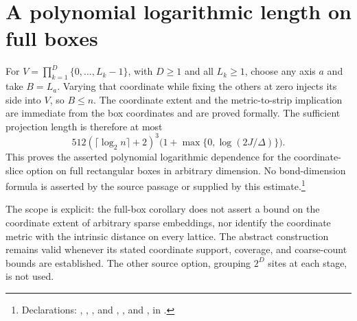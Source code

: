 \documentclass{article}
\begin{document}
\section{A polynomial logarithmic length on full boxes}

For $V=\prod_{k=1}^D\{0,\ldots,L_k-1\}$, with $D\ge1$ and all
$L_k\ge1$, choose any axis $a$ and take $B=L_a$. Varying that coordinate
while fixing the others at zero injects its side into $V$, so $B\le n$.
The coordinate extent and the metric-to-strip implication are immediate
from the box coordinates and are proved formally. The sufficient
projection length is therefore at most
\[
 512(\lceil\log_2n\rceil+2)^3
 \bigl(1+\max\{0,\log(2J/\Delta)\}\bigr).
\]
This proves the asserted polynomial logarithmic dependence for the
coordinate-slice option on full rectangular boxes in arbitrary dimension.
No bond-dimension formula is asserted by the source passage or supplied
by this estimate.\footnote{Declarations:
,
,
, and
,
, and
,
in .}

The scope is explicit: the full-box corollary does not assert a bound on
the coordinate extent of arbitrary sparse embeddings, nor identify the
coordinate metric with the intrinsic distance on every lattice. The
abstract construction remains valid whenever its stated coordinate
support, coverage, and coarse-count bounds are established. The other
source option, grouping $2^D$ sites at each stage, is not used.



\end{document}
